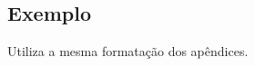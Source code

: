 
\begin{anexosenv}
\partanexos   %
\chapter{Exemplo}

Utiliza a mesma formatação dos apêndices.


\end{anexosenv}
